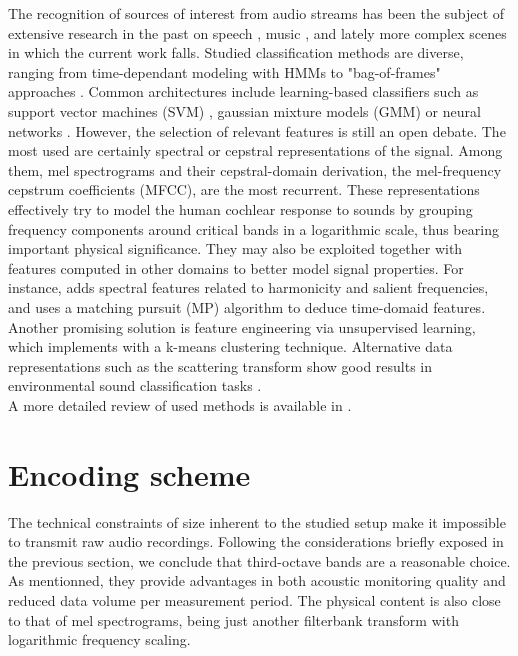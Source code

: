 \documentclass[final,3p,times,twocolumn]{elsarticle}
\begin{document}
The recognition of sources of interest from audio streams has been the subject of extensive research in the past on speech \cite{anusuya2009}, music \cite{tzanetakis2002}, and lately more complex scenes in which the current work falls. Studied classification methods are diverse, ranging from time-dependant modeling with HMMs \cite{ntalampiras2014} to "bag-of-frames" approaches \cite{aucouturier2007, foggia2015}. Common architectures include learning-based classifiers such as support vector machines (SVM) \cite{kumar2016}, gaussian mixture models (GMM) \cite{radhakrishnan2005} or neural networks \cite{salamon2017, piczak2015}. However, the selection of relevant features is still an open debate. The most used are certainly spectral \cite{khunarsal2013} or cepstral \cite{couvreur2004} representations of the signal. Among them, mel spectrograms and their cepstral-domain derivation, the mel-frequency cepstrum coefficients (MFCC), are the most recurrent. These representations effectively try to model the human cochlear response to sounds by grouping frequency components around critical bands in a logarithmic scale, thus bearing important physical significance. They may also be exploited together with features computed in other domains to better model signal properties. For instance, \cite{cai2006} adds spectral features related to harmonicity and salient frequencies, and \cite{chu2009} uses a matching pursuit (MP) algorithm to deduce time-domaid features. Another promising solution is feature engineering via unsupervised learning, which \cite{salamon2015-2} implements with a k-means clustering technique. Alternative data representations such as the scattering transform \cite{bauge2013} show good results in environmental sound classification tasks \cite{salamon2015}.\\
A more detailed review of used methods is available in \cite{chachada2013}.

\section{Encoding scheme}

The technical constraints of size inherent to the studied setup make it impossible to transmit raw audio recordings. Following the considerations briefly exposed in the previous section, we conclude that third-octave bands are a reasonable choice. As mentionned, they provide advantages in both acoustic monitoring quality and reduced data volume per measurement period. The physical content is also close to that of mel spectrograms, being just another filterbank transform with logarithmic frequency scaling.\\
\end{document}
